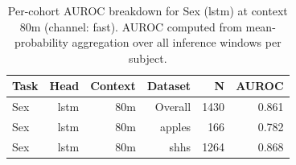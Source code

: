 \begin{table}[ht]
\centering
\caption{Per-cohort AUROC breakdown for Sex (lstm) at context 80m (channel: fast). AUROC computed from mean-probability aggregation over all inference windows per subject.}
\label{tab:cohort_sex_binary_lstm_fast}
\begin{tabular}{lrrrrr}
\toprule
Task & Head & Context & Dataset & N & AUROC \\
\midrule
Sex & lstm & 80m & Overall & 1430 & 0.861 \\
Sex & lstm & 80m & apples & 166 & 0.782 \\
Sex & lstm & 80m & shhs & 1264 & 0.868 \\
\bottomrule
\end{tabular}
\end{table}